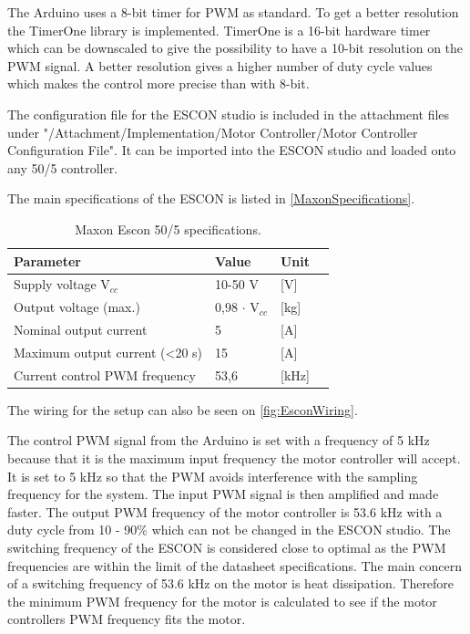 The Arduino uses a 8-bit timer for PWM as standard. To get a better resolution the TimerOne library is implemented. TimerOne is a 16-bit hardware timer which can be downscaled to give the possibility to have a 10-bit resolution on the PWM signal. A better resolution gives a higher number of duty cycle values which makes the control more precise than with 8-bit. 


The configuration file for the ESCON studio is included in the attachment files under "/Attachment/Implementation/Motor Controller/Motor Controller Configuration File". It can be imported into the ESCON studio and loaded onto any 50/5 controller.

The main specifications of the ESCON is listed in \autoref{MaxonSpecifications}.

\begin{table}[htbp]
	\centering
\caption{Maxon Escon 50/5 specifications\citep{datasheet:maxon}.}
\label{MaxonSpecifications}
	\begin{tabular}{llll}
	\hline
	Parameter & Value & Unit \\ \hline
	Supply voltage V$_{cc}$& 10-50 V & {[}V{]} \\
	Output voltage (max.) & 0,98 $\cdot$ V$_{cc}$& {[}kg{]} \\
	Nominal output current & 5 & {[}A{]} \\
	Maximum output current (<20 s) & 15 & {[}A{]}\\
	Current control PWM frequency & 53,6 & {[}kHz{]}
	\end{tabular}
\end{table}

The wiring for the setup can also be seen on \autoref{fig:EsconWiring}.  

\newpage
The control PWM signal from the Arduino is set with a frequency of 5 kHz because that it is the maximum input frequency the motor controller will accept. It is set to 5 kHz so that the PWM avoids interference with the sampling frequency for the system.
The input PWM signal is then amplified and made faster. The output PWM frequency of the motor controller is 53.6 kHz with a duty cycle from 10 - 90\% which can not be changed in the ESCON studio. The switching frequency of the ESCON is considered close to optimal as the PWM frequencies are within the limit of the datasheet specifications. The main concern of a switching frequency of 53.6 kHz on the motor is heat dissipation. Therefore the minimum PWM frequency for the motor is calculated to see if the motor controllers PWM frequency fits the motor.


